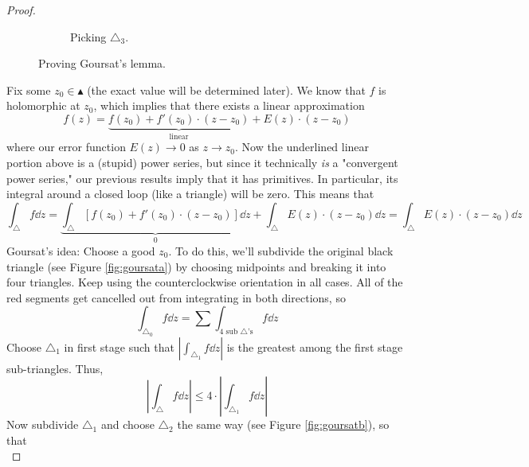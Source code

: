 \documentclass[../notes.tex]{subfiles}
\begin{document}
\begin{itemize}
\begin{proof}
\begin{figure}[h!]
\begin{subfigure}[b]{0.3\linewidth}
                \caption{Picking $\triangle_3$.}
                \label{fig:goursatc}
            \end{subfigure}
            \caption{Proving Goursat's lemma.}
            \label{fig:goursat}
        \end{figure}
        Fix some $z_0\in\blacktriangle$ (the exact value will be determined later). We know that $f$ is holomorphic at $z_0$, which implies that there exists a linear approximation
        \begin{equation*}
            f(z) = \underbrace{f(z_0)+f'(z_0)\cdot(z-z_0)}_\text{linear}+E(z)\cdot(z-z_0)
        \end{equation*}
        where our error function $E(z)\to 0$ as $z\to z_0$. Now the underlined linear portion above is a (stupid) power series, but since it technically \emph{is} a "convergent power series," our previous results imply that it has primitives. In particular, its integral around a closed loop (like a triangle) will be zero. This means that
        \begin{equation*}
            \int_\triangle f\dd{z} = \underbrace{\int_\triangle[f(z_0)+f'(z_0)\cdot(z-z_0)]\dd{z}}_0+\int_\triangle E(z)\cdot(z-z_0)\dd{z}
            = \int_\triangle E(z)\cdot(z-z_0)\dd{z}
        \end{equation*}
        Goursat's idea: Choose a good $z_0$. To do this, we'll subdivide the original black triangle (see Figure \ref{fig:goursata}) by choosing midpoints and breaking it into four triangles. Keep using the counterclockwise orientation in all cases. All of the red segments get cancelled out from integrating in both directions, so
        \begin{equation*}
            \int_{\triangle_0}f\dd{z} = \sum\int_{4\text{ sub }\triangle\text{'s}}f\dd{z}
        \end{equation*}
        Choose $\triangle_1$ in first stage such that $|\int_{\triangle_1}f\dd{z}|$ is the greatest among the first stage sub-triangles. Thus,
        \begin{equation*}
            \left| \int_\triangle f\dd{z} \right| \leq 4\cdot\left| \int_{\triangle_1}f\dd{z} \right|
        \end{equation*}
        Now subdivide $\triangle_1$ and choose $\triangle_2$ the same way (see Figure \ref{fig:goursatb}), so that
        \begin{equation*}

\end{equation*}
\end{proof}
\end{itemize}
\end{document}
